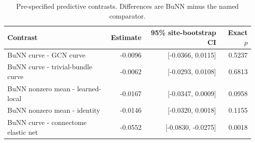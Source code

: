 \begin{table}[!t]
\centering
\caption{Pre-specified predictive contrasts. Differences are BuNN minus the named comparator.}
\label{tab:confirmatory}
\footnotesize
\begin{tabularx}{\textwidth}{Xrrr}
\toprule
Contrast & Estimate & 95\% site-bootstrap CI & Exact $p$ \\
\midrule
BuNN curve - GCN curve & -0.0096 & [-0.0366, 0.0115] & 0.5237 \\
BuNN curve - trivial-bundle curve & -0.0062 & [-0.0293, 0.0108] & 0.6813 \\
BuNN nonzero mean - learned-local & -0.0167 & [-0.0347, 0.0009] & 0.0958 \\
BuNN nonzero mean - identity & -0.0146 & [-0.0320, 0.0018] & 0.1155 \\
BuNN curve - connectome elastic net & -0.0552 & [-0.0830, -0.0275] & 0.0018 \\
\bottomrule
\end{tabularx}
\end{table}
